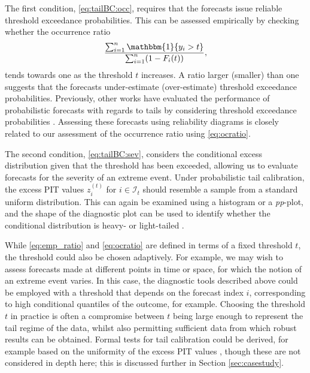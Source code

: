 \documentclass[12pt]{article}
\newcommand{\one}{\mathbbm{1}}
\newcommand{\Ii}{\mathcal{I}}
\newcommand{\1}{\mathbf{1}} %
\newcommand{\zit}{z_{i}^{(t)}}
\theoremstyle{definition}
\begin{document}
The first condition, \eqref{eq:tailBC:occ}, requires that the forecasts issue reliable threshold exceedance probabilities. This can be assessed empirically by checking whether the occurrence ratio 
\begin{equation}
	\label{eq:ocratio}
	\frac{\sum_{i=1}^{n} \one\{ y_{i} > t\}}{\sum_{i=1}^{n} (1 - F_{i}(t))},
\end{equation}
tends towards one as the threshold $t$ increases. A ratio larger (smaller) than one suggests that the forecasts under-estimate (over-estimate) threshold exceedance probabilities. Previously, other works have evaluated the performance of probabilistic forecasts with regards to tails by considering threshold exceedance probabilities \citep[see e.g.][]{WilliamsEtAl2014,TaillardatFougeresETAL2019,AllenEtAl2023}. Assessing these forecasts using reliability diagrams is closely related to our assessment of the occurrence ratio using \eqref{eq:ocratio}.

The second condition, \eqref{eq:tailBC:sev}, considers the conditional excess distribution given that the threshold has been exceeded, allowing us to evaluate forecasts for the severity of an extreme event. Under probabilistic tail calibration, the excess PIT values $\zit$ for $i \in \Ii_{t}$ should resemble a sample from a standard uniform distribution. This can again be examined using a histogram or a \emph{pp}-plot, and the shape of the diagnostic plot can be used to identify whether the conditional distribution is heavy- or light-tailed \citep{AllenEtAl2023}.

While \eqref{eq:emp_ratio} and \eqref{eq:ocratio} are defined in terms of a fixed threshold $t$, the threshold could also be chosen adaptively. For example, we may wish to assess forecasts made at different points in time or space, for which the notion of an extreme event varies. In this case, the diagnostic tools described above could be employed with a threshold that depends on the forecast index $i$, corresponding to high conditional quantiles of the outcome, for example. Choosing the threshold $t$ in practice is often a compromise between $t$ being large enough to represent the tail regime of the data, whilst also permitting sufficient data from which robust results can be obtained. Formal tests for tail calibration could be derived, for example based on the uniformity of the excess PIT values \citep[e.g.][]{MitchellWeale2023}, though these are not considered in depth here; this is discussed further in Section \ref{sec:casestudy}.
\end{document}

